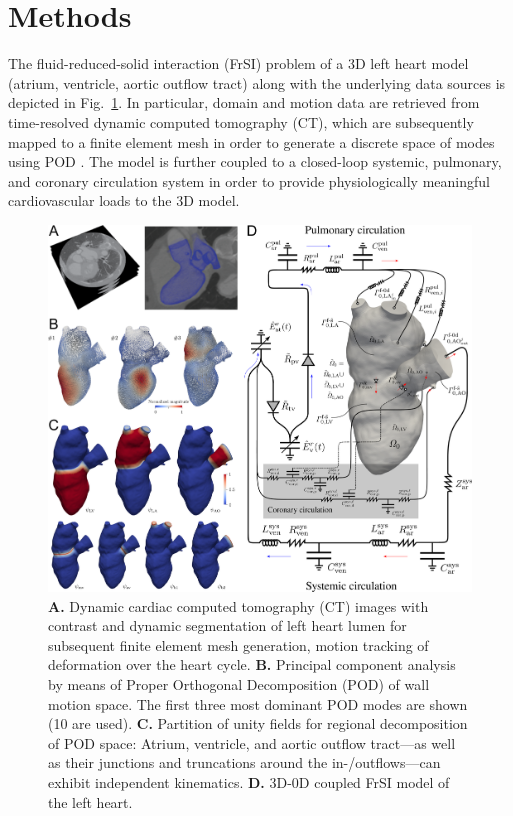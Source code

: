 \section*{Methods}
The fluid-reduced-solid interaction (FrSI) problem of a 3D left heart model (atrium, ventricle, aortic outflow tract) along with the underlying data sources is depicted in Fig.~\ref{fig:heart_problem}. 
In particular, domain and motion data are retrieved from time-resolved dynamic computed tomography (CT), which are subsequently mapped to a finite element mesh in order to generate a discrete space of modes using POD \cite{rathinam2003}. 
The model is further coupled to a closed-loop systemic, pulmonary, and coronary circulation system \cite{hirschvogel2017,arthurs2016} in order to provide physiologically meaningful cardiovascular loads to the 3D model.
\begin{figure}[!htp]
\centering
\includegraphics[width=1\textwidth]{chapters/hirschvogel/heart_problem.pdf}
\caption{\textbf{A.} Dynamic cardiac computed tomography (CT) images with contrast and dynamic segmentation of left heart lumen for subsequent finite element mesh generation, motion tracking of deformation over the heart cycle. 
\textbf{B.} Principal component analysis by means of Proper Orthogonal Decomposition (POD) of wall motion space. The first three most dominant POD modes are shown (10 are used). 
\textbf{C.} Partition of unity fields for regional decomposition of POD space: Atrium, ventricle, and aortic outflow tract---as well as their junctions and truncations around the in-/outflows---can exhibit independent kinematics. 
\textbf{D.} 3D-0D coupled FrSI model of the left heart.}\label{fig:heart_problem}
\end{figure}

